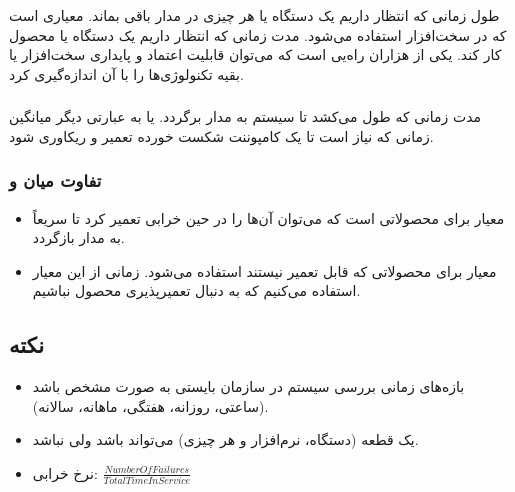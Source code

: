 \subsubsection{}

طول زمانی که انتظار داریم یک دستگاه یا هر چیزی در مدار باقی بماند. 
معیاری است که در سخت‌افزار استفاده می‌شود. مدت زمانی که انتظار داریم یک دستگاه
یا محصول کار کند.  یکی از هزاران راه‌یی است که می‌توان قابلیت اعتماد و
پایداری سخت‌افزار یا بقیه تکنولوژی‌ها را با آن اندازه‌گیری کرد.

\subsubsection{}

مدت زمانی که طول می‌کشد تا سیستم به مدار برگردد. یا به عبارتی دیگر میانگین زمانی
که نیاز است تا یک کامپوننت شکست خورده تعمیر و ریکاوری شود.

\subsubsection{تفاوت میان  و }

\begin{itemize}
    \item معیار  برای محصولاتی است که می‌توان آن‌ها را در حین خرابی
    تعمیر کرد تا سریعاً به مدار بازگردد.
    \item معیار  برای محصولاتی که قابل تعمیر نیستند استفاده می‌شود.
    زمانی از این معیار استفاده می‌کنیم که به دنبال تعمیرپذیری محصول نباشیم.
\end{itemize}

\subsection*{نکته}

\begin{itemize}
    \item بازه‌های زمانی بررسی سیستم در سازمان بایستی به صورت مشخص باشد (ساعتی،
    روزانه، هفتگی، ماهانه، سالانه).
    \item یک قطعه (دستگاه، نرم‌افزار و هر چیزی) می‌تواند  باشد ولی
     نباشد.
    \item نرخ خرابی: $\frac{Number Of Failures}{Total Time In Service}$
\end{itemize}